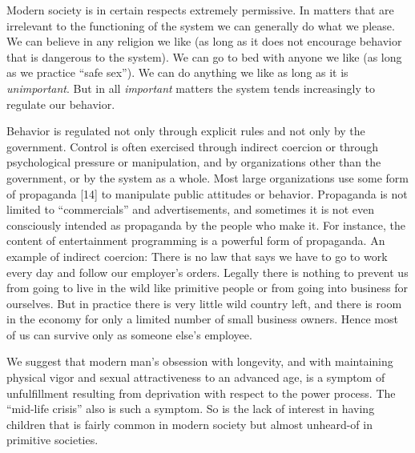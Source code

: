  Modern society is in certain respects extremely permissive. In matters that are irrelevant to the functioning of the system we can generally do what we please. We can believe in any religion we like (as long as it does not encourage behavior that is dangerous to the system). We can go to bed with anyone we like (as long as we practice “safe sex”). We can do anything we like as long as it is {\em unimportant}. But in all {\em important} matters the system tends increasingly to regulate our behavior.

 Behavior is regulated not only through explicit rules and not only by the government. Control is often exercised through indirect coercion or through psychological pressure or manipulation, and by organizations other than the government, or by the system as a whole. Most large organizations use some form of propaganda [14] to manipulate public attitudes or behavior. Propaganda is not limited to “commercials” and advertisements, and sometimes it is not even consciously intended as propaganda by the people who make it. For instance, the content of entertainment programming is a powerful form of propaganda. An example of indirect coercion: There is no law that says we have to go to work every day and follow our employer’s orders. Legally there is nothing to prevent us from going to live in the wild like primitive people or from going into business for ourselves. But in practice there is very little wild country left, and there is room in the economy for only a limited number of small business owners. Hence most of us can survive only as someone else’s employee.

 We suggest that modern man’s obsession with longevity, and with maintaining physical vigor and sexual attractiveness to an advanced age, is a symptom of unfulfillment resulting from deprivation with respect to the power process. The “mid-life crisis” also is such a symptom. So is the lack of interest in having children that is fairly common in modern society but almost unheard-of in primitive societies.


